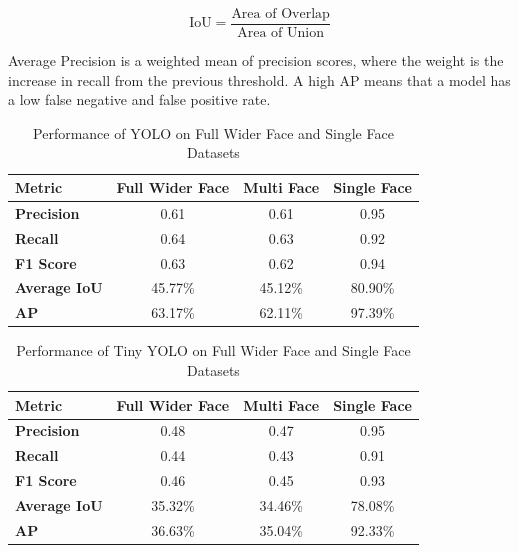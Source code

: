 \[
\text{IoU} = \frac{\text{Area of Overlap}}{\text{Area of Union}}
\]
 
Average Precision is a weighted mean of precision scores, where the weight is the increase in recall from the previous threshold. A high AP means that a model has a low false negative and false positive rate.

\begin{table}[h!]
\centering{}
\caption{Performance of YOLO on Full Wider Face and Single Face Datasets}
\begin{tabular}{|l|c|c|c|}
\hline
\textbf{Metric}      & \textbf{Full Wider Face} & \textbf{Multi Face}  & \textbf{Single Face} \\ \hline
\textbf{Precision}   & 0.61        & 0.61            & 0.95                 \\ \hline
\textbf{Recall}      & 0.64        & 0.63            & 0.92                 \\ \hline
\textbf{F1 Score}    & 0.63        & 0.62            & 0.94                 \\ \hline
\textbf{Average IoU} & 45.77\%     & 45.12\%            & 80.90\%              \\ \hline
\textbf{AP}          & 63.17\%     & 62.11\%              & 97.39\%              \\ \hline
\end{tabular}
\label{tab:YOLO}
\end{table}

\begin{table}[h!]
\centering{}
\caption{Performance of Tiny YOLO on Full Wider Face and Single Face Datasets}
\begin{tabular}{|l|c|c|c|}
\hline
\textbf{Metric}      & \textbf{Full Wider Face} & \textbf{Multi Face}  & \textbf{Single Face} \\ \hline
\textbf{Precision}   & 0.48        & 0.47            & 0.95                 \\ \hline
\textbf{Recall}      & 0.44        & 0.43            & 0.91                 \\ \hline
\textbf{F1 Score}    & 0.46        & 0.45            & 0.93                 \\ \hline
\textbf{Average IoU} & 35.32\%     & 34.46\%            & 78.08\%              \\ \hline
\textbf{AP}          & 36.63\%     & 35.04\%             & 92.33\%              \\ \hline
\end{tabular}

\label{tab:TINYYOLO}
\end{table}


